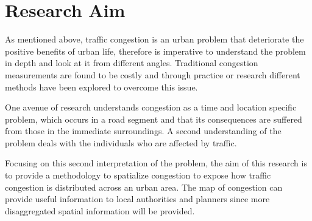 \documentclass[a4paper]{jpconf}
\begin{document}
\section{Research Aim}
\indent As mentioned above, traffic congestion is an urban problem that deteriorate the positive benefits of urban life, therefore is imperative to understand the problem in depth and look at it from different angles. Traditional congestion measurements are found to be costly and through practice or research different methods have been explored to overcome this issue. \par
\indent One avenue of research understands congestion as a time and location specific problem, which occurs in a road segment and that its consequences are suffered from those in the immediate surroundings. A second understanding of the problem deals with the individuals who are affected by traffic. \par
\indent Focusing on this second interpretation of the problem, the aim of this research is to provide a methodology to spatialize congestion to expose how traffic congestion is distributed across an urban area. The map of congestion can provide useful information to local authorities and planners since more disaggregated spatial information will be provided. \par
\end{document}
